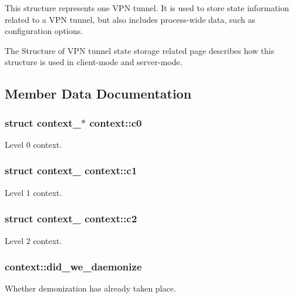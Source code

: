 This structure represents one V\+P\+N tunnel. It is used to store state information related to a V\+P\+N tunnel, but also includes process-\/wide data, such as configuration options.

The Structure of V\+P\+N tunnel state storage related page describes how this structure is used in client-\/mode and server-\/mode. 

\subsection{Member Data Documentation}
\hypertarget{structcontext_a1d0cd1cb672a5fee441bdc504fc0fa93}{}
\subsubsection[{c0}]{\setlength{\rightskip}{0pt plus 5cm}struct {\bf context\+\_}$\ast$ context\+::c0}\label{structcontext_a1d0cd1cb672a5fee441bdc504fc0fa93}
Level 0 context. \hypertarget{structcontext_aea116e1362b8f75f5fd13e8c06fc0cf3}{}
\subsubsection[{c1}]{\setlength{\rightskip}{0pt plus 5cm}struct {\bf context\+\_} context\+::c1}\label{structcontext_aea116e1362b8f75f5fd13e8c06fc0cf3}
Level 1 context. \hypertarget{structcontext_a8d609499dcba303c18f50ef7b648644c}{}
\subsubsection[{c2}]{\setlength{\rightskip}{0pt plus 5cm}struct {\bf context\+\_} context\+::c2}\label{structcontext_a8d609499dcba303c18f50ef7b648644c}
Level 2 context. \hypertarget{structcontext_a34ef38cd7f895386a75d592fa0c820d8}{}
\subsubsection[{did\+\_\+we\+\_\+daemonize}]{ context\+::did\+\_\+we\+\_\+daemonize}\label{structcontext_a34ef38cd7f895386a75d592fa0c820d8}
Whether demonization has already taken place. \hypertarget{structcontext_a9b3f2f6a6281c99c8c1e26598875d5ab}{}
